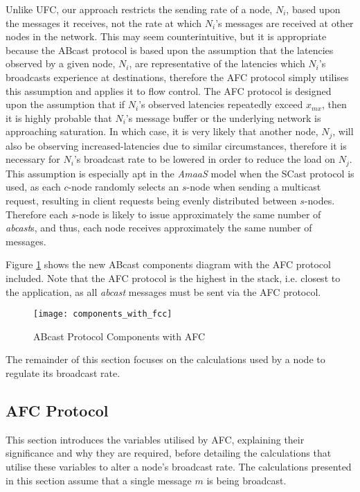     Unlike \textsf{UFC}, our approach restricts the sending rate of a node, $N_i$, based upon the messages it receives, not the rate at which $N_i$'s messages are received at other nodes in the network.  This may seem counterintuitive, but it is appropriate because the \textsf{ABcast} protocol is based upon the assumption that the latencies observed by a given node, $N_i$, are representative of the latencies which $N_i$'s broadcasts experience at destinations, therefore the AFC protocol simply utilises this assumption and applies it to flow control.  The AFC protocol is designed upon the assumption that if $N_i$'s observed latencies repeatedly exceed $x_{mx}$, then it is highly probable that $N_i$'s message buffer or the underlying network is approaching saturation.  In which case, it is very likely that another node, $N_j$, will also be observing increased-latencies due to similar circumstances, therefore it is necessary for $N_i$'s broadcast rate to be lowered in order to reduce the load on $N_j$.  This assumption is especially apt in the \emph{AmaaS} model when the \textsf{SCast} protocol is used, as each $c$-node randomly selects an $s$-node when sending a multicast request, resulting in client requests being evenly distributed between $s$-nodes.  Therefore each $s$-node is likely to issue approximately the same number of \emph{abcast}s, and thus, each node receives approximately the same number of messages.          
    
    Figure \ref{fig:abcast_components_afc} shows the new \textsf{ABcast} components diagram with the AFC protocol included.  Note that the AFC protocol is the highest in the stack, i.e. closest to the application, as all \emph{abcast} messages must be sent via the AFC protocol.  
        
    \begin{figure}[!h] 
        \centering    
         \texttt{[image: components\_with\_fcc]}
         \caption[\textsf{ABcast} Protocol Components with AFC]{\textsf{ABcast} Protocol Components with AFC}
         \label{fig:abcast_components_afc}
    \end{figure}        
    
    The remainder of this section focuses on the calculations used by a node to regulate its broadcast rate.  
    
    \subsection{AFC Protocol}     
     This section introduces the variables utilised by AFC, explaining their significance and why they are required, before detailing the calculations that utilise these variables to alter a node's broadcast rate.  The calculations presented in this section assume that a single message $m$ is being broadcast.  
         
